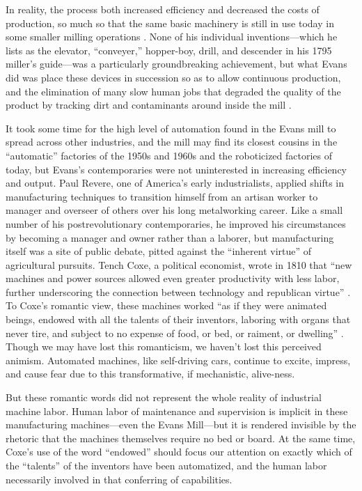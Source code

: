 In reality, the process both increased efficiency and decreased the costs
of production, so much so that the same basic machinery is still in
use today in some smaller milling operations \cite{wyegrist}. None of his individual
inventions---which he lists as the elevator, ``conveyer,'' hopper-boy,
drill, and descender in his 1795 miller's guide---was a particularly
groundbreaking achievement, but what Evans did was place these devices
in succession so as to allow continuous production, and the
elimination of many slow human jobs that degraded the quality of the
product by tracking dirt and contaminants around inside the
mill \cite[p. 203]{evansMillguide}. 

It took some time for the high level of automation found in the Evans
mill to spread across other industries, and the mill may find its
closest cousins in the ``automatic'' factories of the 1950s and 1960s
and the roboticized factories of today, but Evans's contemporaries
were not uninterested in increasing efficiency and output. Paul
Revere, one of America's early industrialists, applied shifts in
manufacturing techniques to transition himself from an
artisan worker to manager and overseer of others over his long
metalworking career.\cite[p. 187]{martello} Like a small number of his postrevolutionary
contemporaries, he improved his circumstances by becoming a manager
and owner rather than a laborer, but manufacturing itself was a site of public
debate, pitted against the ``inherent virtue'' of agricultural pursuits.
Tench Coxe, a political economist, wrote in 1810 that ``new machines
and power sources allowed even greater productivity with less labor,
further underscoring the connection between technology and republican
virtue'' \cite[p. 217]{martello}. To Coxe's romantic view, these machines  worked ``as if they
were animated beings, endowed with all the talents of their inventors,
laboring with organs that never tire, and subject to no expense of
food, or bed, or raiment, or dwelling'' \cite[p. xxv]{coxe}. Though we
may have lost this romanticism, we haven't lost this perceived
animism. Automated machines, like self-driving cars, continue to
excite, impress, and cause fear due to this transformative, if
mechanistic, alive-ness.

But these romantic words did not represent the whole reality of
industrial machine labor. Human labor of
maintenance and supervision is implicit in these manufacturing
machines---even the Evans Mill---but it is rendered invisible by the rhetoric that the
machines themselves require no bed or board. At the same time, Coxe's
use of the word ``endowed'' should focus our attention on exactly which
of the ``talents'' of the inventors have been automatized, and the human
labor necessarily involved in that conferring of capabilities. 

